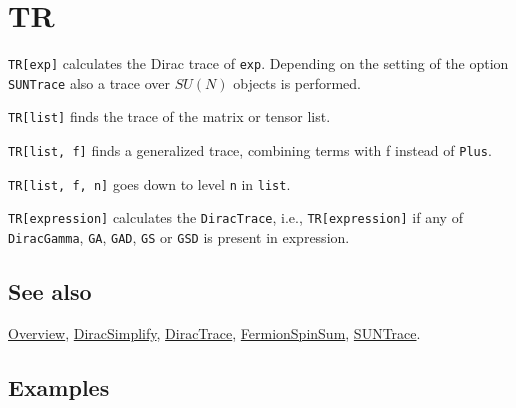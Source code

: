 \documentclass[../FeynCalcManual.tex]{subfiles}
\begin{document}
\begin{Shaded}
\begin{Highlighting}[]
 
\end{Highlighting}
\end{Shaded}

\hypertarget{tr}{
\section{TR}\label{tr}}

\texttt{TR[\allowbreak{}exp]} calculates the Dirac trace of
\texttt{exp}. Depending on the setting of the option \texttt{SUNTrace}
also a trace over \(SU(N)\) objects is performed.

\texttt{TR[\allowbreak{}list]} finds the trace of the matrix or tensor
list.

\texttt{TR[\allowbreak{}list,\ \allowbreak{}f]} finds a generalized
trace, combining terms with f instead of \texttt{Plus}.

\texttt{TR[\allowbreak{}list,\ \allowbreak{}f,\ \allowbreak{}n]} goes
down to level \texttt{n} in \texttt{list}.

\texttt{TR[\allowbreak{}expression]} calculates the \texttt{DiracTrace},
i.e., \texttt{TR[\allowbreak{}expression]} if any of
\texttt{DiracGamma}, \texttt{GA}, \texttt{GAD}, \texttt{GS} or
\texttt{GSD} is present in expression.

\subsection{See also}

\hyperlink{toc}{Overview}, \hyperlink{diracsimplify}{DiracSimplify},
\hyperlink{diractrace}{DiracTrace},
\hyperlink{fermionspinsum}{FermionSpinSum},
\hyperlink{suntrace}{SUNTrace}.

\subsection{Examples}

\begin{Shaded}
\begin{Highlighting}[]
\OperatorTok{[}\SpecialCharTok{\textbackslash{}}\OperatorTok{[}\OperatorTok{],} \SpecialCharTok{\textbackslash{}}\OperatorTok{[}\OperatorTok{]]} 
 
\OperatorTok{[}\SpecialCharTok{\%}\OperatorTok{]}
\end{Highlighting}
\end{Shaded}
\end{document}

